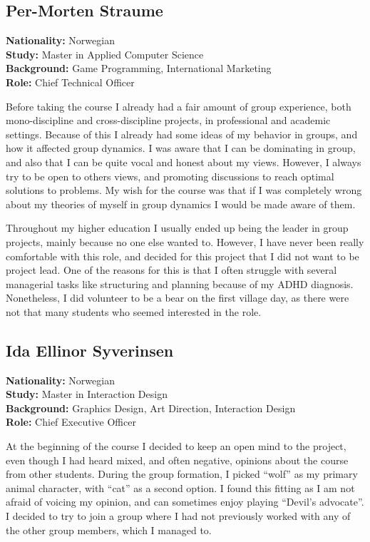 \subsection{Per-Morten Straume}
\textbf{Nationality:} Norwegian \\
\textbf{Study:} Master in Applied Computer Science \\ 
\textbf{Background:} Game Programming, International Marketing \\
\textbf{Role:} Chief Technical Officer

Before taking the course I already had a fair amount of group experience, both mono-discipline and cross-discipline projects, in professional and academic settings. Because of this I already had some ideas of my behavior in groups, and how it affected group dynamics. I was aware that I can be dominating in group, and also that I can be quite vocal and honest about my views. However, I always try to be open to others views, and promoting discussions to reach optimal solutions to problems. My wish for the course was that if I was completely wrong about my theories of myself in group dynamics I would be made aware of them.

Throughout my higher education I usually ended up being the leader in group projects, mainly because no one else wanted to. However, I have never been really comfortable with this role, and decided for this project that I did not want to be project lead. One of the reasons for this is that I often struggle with several managerial tasks like structuring and planning because of my ADHD diagnosis. Nonetheless, I did volunteer to be a bear on the first village day, as there were not that many students who seemed interested in the role.


\subsection{Ida Ellinor Syverinsen}
\textbf{Nationality:} Norwegian \\
\textbf{Study:} Master in Interaction Design \\
\textbf{Background:} Graphics Design, Art Direction, Interaction Design \\
\textbf{Role:} Chief Executive Officer

At the beginning of the course I decided to keep an open mind to the project, even though I had heard mixed, and often negative, opinions about the course from other students. During the group formation, I picked “wolf” as my primary animal character, with “cat” as a second option. I found this fitting as I am not afraid of voicing my opinion, and can sometimes enjoy playing “Devil’s advocate”. I decided to try to join a group where I had not previously worked with any of the other group members, which I managed to. 

